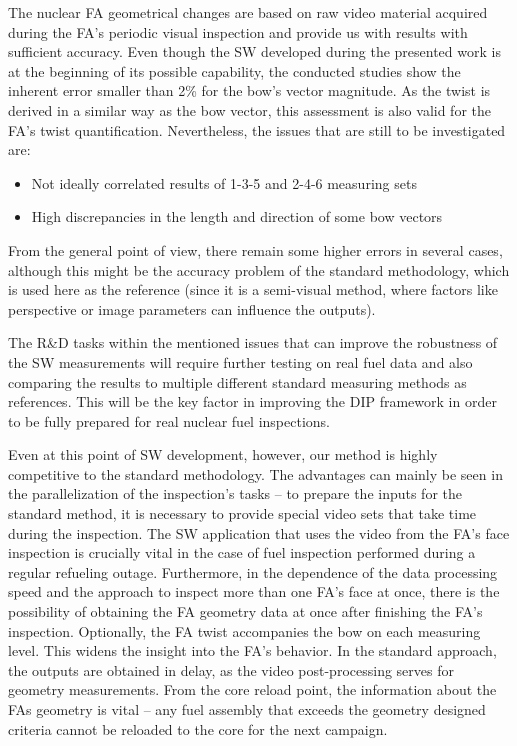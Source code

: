 \documentclass[preprint,12pt]{elsarticle}
\begin{document}
The nuclear \ac{FA} geometrical changes are based on raw video material acquired during the \ac{FA}'s periodic visual inspection and provide us with results with sufficient accuracy. Even though the \ac{SW} developed during the presented work is at the beginning of its possible capability, the conducted studies show the inherent error smaller than 2\% for the bow's vector magnitude. As the twist is derived in a similar way as the bow vector, this assessment is also valid for the \ac{FA}'s twist quantification. Nevertheless, the issues that are still to be investigated are:

\begin{itemize}
\item Not ideally correlated results of 1-3-5 and 2-4-6 measuring sets
\item High discrepancies in the length and direction of some bow vectors
\end{itemize}

From the general point of view, there remain some higher errors in several cases, although this might be the accuracy problem of the standard methodology, which is used here as the reference (since it is a semi-visual method, where factors like perspective or image parameters can influence the outputs).

The R\&D tasks within the mentioned issues that can improve the robustness of the \ac{SW} measurements will require further testing on real fuel data and also comparing the results to multiple different standard measuring methods as references. This will be the key factor in improving the DIP framework in order to be fully prepared for real nuclear fuel inspections.

Even at this point of \ac{SW} development, however, our method is highly competitive to the standard methodology. The advantages can mainly be seen in the parallelization of the inspection's tasks – to prepare the inputs for the standard method, it is necessary to provide special video sets that take time during the inspection. The \ac{SW} application that uses the video from the \ac{FA}'s face inspection is crucially vital in the case of fuel inspection performed during a regular refueling outage. Furthermore, in the dependence of the data processing speed and the approach to inspect more than one \ac{FA}'s face at once, there is the possibility of obtaining the \ac{FA} geometry data at once after finishing the \ac{FA}'s inspection. Optionally, the \ac{FA} twist accompanies the bow on each measuring level. This widens the insight into the \ac{FA}'s behavior.  In the standard approach, the outputs are obtained in delay, as the video post-processing serves for geometry measurements. From the core reload point, the information about the \ac{FA}s geometry is vital – any fuel assembly that exceeds the geometry designed criteria cannot be reloaded to the core for the next campaign. 
\end{document}
